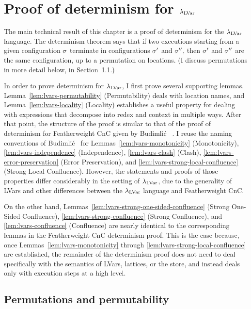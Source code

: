 \section{Proof of determinism for $\lambda_{\textrm{LVar}}$}\label{s:lvars-proof}

The main technical result of this chapter is a proof of determinism
for the $\lambda_{\textrm{LVar}}$ language.  The determinism theorem says that if
two executions starting from a given configuration $\sigma$ terminate
in configurations $\sigma'$ and $\sigma''$, then $\sigma'$ and $\sigma''$
are the same configuration, up to a permutation on locations.  (I
discuss permutations in more detail below, in
Section~\ref{subsection:lvars-permutations}.)

In order to prove determinism for $\lambda_{\textrm{LVar}}$, I first prove several
supporting lemmas.  Lemma~\ref{lem:lvars-permutability}
(Permutability) deals with location names, and
Lemma~\ref{lem:lvars-locality} (Locality) establishes a useful
property for dealing with expressions that decompose into redex and
context in multiple ways.  After that point, the structure of the
proof is similar to that of the proof of determinism for Featherweight
CnC given by Budimli\'c \etal~\cite{CnC}.  I reuse the naming
conventions of Budimli\'c \etal~for
Lemmas~\ref{lem:lvars-monotonicity} (Monotonicity),
\ref{lem:lvars-independence} (Independence), \ref{lem:lvars-clash}
(Clash), \ref{lem:lvars-error-preservation} (Error Preservation), and
\ref{lem:lvars-strong-local-confluence} (Strong Local
Confluence). However, the statements and proofs of those properties
differ considerably in the setting of $\lambda_{\textrm{LVar}}$, due to the
generality of LVars and other differences between the $\lambda_{\textrm{LVar}}$
language and Featherweight CnC.

On the other hand, Lemmas~\ref{lem:lvars-strong-one-sided-confluence}
(Strong One-Sided Confluence), \ref{lem:lvars-strong-confluence}
(Strong Confluence), and \ref{lem:lvars-confluence} (Confluence) are
nearly identical to the corresponding lemmas in the Featherweight CnC
determinism proof.  This is the case because, once
Lemmas~\ref{lem:lvars-monotonicity} through
\ref{lem:lvars-strong-local-confluence} are established, the remainder
of the determinism proof does not need to deal specifically with the
semantics of LVars, lattices, or the store, and instead deals only
with execution steps at a high level.

\subsection{Permutations and permutability}\label{subsection:lvars-permutations}

